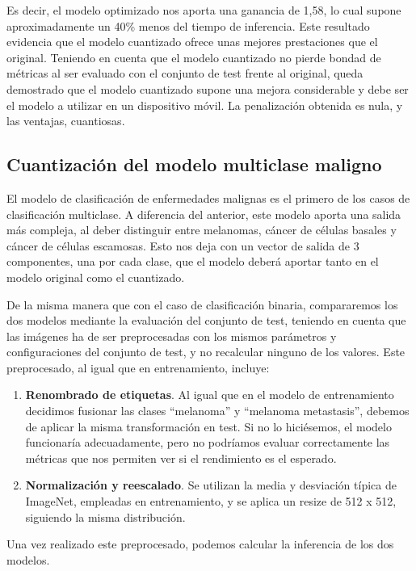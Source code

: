 Es decir, el modelo optimizado nos aporta una ganancia de 1,58, lo cual supone aproximadamente un 40\% menos del tiempo de inferencia. Este resultado evidencia que el modelo cuantizado ofrece unas mejores prestaciones que el original. Teniendo en cuenta que el modelo cuantizado no pierde bondad de métricas al ser evaluado con el conjunto de test frente al original, queda demostrado que el modelo cuantizado supone una mejora considerable y debe ser el modelo a utilizar en un dispositivo móvil. La penalización obtenida es nula, y las ventajas, cuantiosas.

\subsection{Cuantización del modelo multiclase maligno}

El modelo de clasificación de enfermedades malignas es el primero de los casos de clasificación multiclase. A diferencia del anterior, este modelo aporta una salida más compleja, al deber distinguir entre melanomas, cáncer de células basales y cáncer de células escamosas. Esto nos deja con un vector de salida de 3 componentes, una por cada clase, que el modelo deberá aportar tanto en el modelo original como el cuantizado.

De la misma manera que con el caso de clasificación binaria, compararemos los dos modelos mediante la evaluación del conjunto de test, teniendo en cuenta que las imágenes ha de ser preprocesadas con los mismos parámetros y configuraciones del conjunto de test, y no recalcular ninguno de los valores. Este preprocesado, al igual que en entrenamiento, incluye:

\begin{enumerate}
	\item \textbf{Renombrado de etiquetas}. Al igual que en el modelo de entrenamiento decidimos fusionar las clases ``melanoma'' y ``melanoma metastasis'', debemos de aplicar la misma transformación en test. Si no lo hiciésemos, el modelo funcionaría adecuadamente, pero no podríamos evaluar correctamente las métricas que nos permiten ver si el rendimiento es el esperado.
	 \item \textbf{Normalización y reescalado}. Se utilizan la media y desviación típica de ImageNet\cite{5206848}, empleadas en entrenamiento, y se aplica un resize de 512 x 512, siguiendo la misma distribución.
\end{enumerate}

Una vez realizado este preprocesado, podemos calcular la inferencia de los dos modelos.

